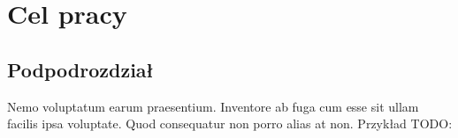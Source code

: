 \section{Cel pracy}

\subsection{Podpodrozdział}

Nemo voluptatum earum praesentium. Inventore ab fuga cum esse sit ullam facilis ipsa voluptate. Quod consequatur non porro alias at non. Przykład TODO:

